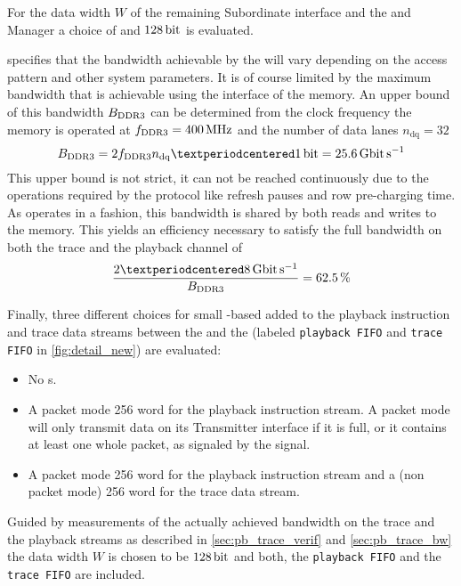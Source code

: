For the data width $W$ of the remaining \XilinxMIG{} \AXI{} Subordinate interface and the \SToMM{} and \MMToS{} \AXI{} Manager a choice of \PhyWordSize{} and $\SI{128}{\bit}$ is evaluated.

\Xilinx{} specifies that the bandwidth achievable by the \XilinxMIG{} will vary depending on the access pattern and other system parameters. It is of course limited by the maximum bandwidth that is achievable using the \DDR{} interface of the memory. An upper bound of this bandwidth $B_{\text{DDR3{}}}$ can be determined from the clock frequency the memory is operated at $f_{\text{DDR3{}}} = \SI{400}{\mega\hertz}$ and the number of data lanes $n_{\text{dq}} = \num{32}$
\[B_{\text{\DDR{}}} = 2 f_{\text{\DDR{}}} n_{\text{dq}} · \SI{1}{\bit} = \SI{25.6}{\giga\bit\per\second}\]
This upper bound is not strict, it can not be reached continuously due to the operations required by the \DDR{} protocol like refresh pauses and row pre-charging time\autocite{ref:ddr3_standard}. As \DDR{} operates in a \halfduplex{} fashion, this bandwidth is shared by both reads and writes to the memory. This yields an efficiency necessary to satisfy the full bandwidth on both the trace and the playback channel of
\[\frac{2 · \pbExecBandwidth{}}{B_{\text{\DDR{}}}} = \SI{62.5}{\percent}\]

Finally, three different choices for small \BRAM{}-based \FIFO{} added to the playback instruction and trace data streams  between the \pbexec{} and the \AXIDMA{} (labeled \texttt{playback FIFO} and \texttt{trace FIFO} in \autoref{fig:detail_new}) are evaluated:
\begin{itemize}
\item No \FIFO{}s.
\item A packet mode \num{256} word \FIFO{} for the playback instruction stream. A packet mode \FIFO{} will only transmit data on its Transmitter interface if it is full, or it contains at least one whole packet, as signaled by the \TLAST{} signal.
\item A packet mode \num{256} word \FIFO{} for the playback instruction stream and a (non packet mode) \num{256} word \FIFO{} for the trace data stream.
\end{itemize}

Guided by measurements of the actually achieved bandwidth on the trace and the playback streams as described in \autoref{sec:pb_trace_verif} and \autoref{sec:pb_trace_bw} the data width $W$ is chosen to be $\SI{128}{\bit}$ and both, the \texttt{playback FIFO} and the \texttt{trace FIFO} are included.

